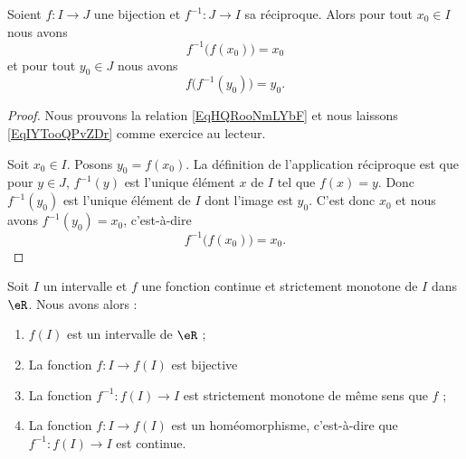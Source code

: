 \begin{proposition}
	Soient \( f\colon I\to J\) une bijection et \( f^{-1}\colon J\to I\) sa réciproque. Alors pour tout \( x_0\in I\) nous avons
	\begin{equation}    \label{EqHQRooNmLYbF}
		f^{-1}\big( f(x_0) \big)=x_0
	\end{equation}
	et pour tout \( y_0\in J\) nous avons
	\begin{equation}    \label{EqIYTooQPvZDr}
		f\big( f^{-1}(y_0) \big)=y_0.
	\end{equation}
\end{proposition}

\begin{proof}
	Nous prouvons la relation \eqref{EqHQRooNmLYbF} et nous laissons \eqref{EqIYTooQPvZDr} comme exercice au lecteur.

	Soit \( x_0\in I\). Posons \( y_0=f(x_0)\). La définition de l'application réciproque est que pour \( y\in J\), \( f^{-1}(y)\) est l'unique élément \( x\) de \( I\) tel que \( f(x)=y\). Donc \( f^{-1}(y_0)\) est l'unique élément de \( I\) dont l'image est \( y_0\). C'est donc \( x_0\) et nous avons \( f^{-1}(y_0)=x_0\), c'est-à-dire
	\begin{equation}
		f^{-1}\big( f(x_0) \big)=x_0.
	\end{equation}
\end{proof}

\begin{theorem} \label{ThoKBRooQKXThd}
	Soit \( I\) un intervalle et \( f\) une fonction continue et strictement monotone de \( I\) dans \( \eR\). Nous avons alors :
	\begin{enumerate}
		\item
		      \( f(I)\) est un intervalle de \( \eR\) ;
		\item       \label{ITEMooMAWXooZXmVwA}
		      La fonction \( f\colon I\to f(I)\) est bijective
		\item
		      La fonction \( f^{-1}\colon f(I)\to I\) est strictement monotone de même sens que \( f\) ;
		\item \label{ItemEJZooKuFoeFiv}
		      La fonction \( f\colon I\to f(I)\) est un homéomorphisme, c'est-à-dire que \( f^{-1}\colon f(I)\to I\) est continue.
	\end{enumerate}
\end{theorem}

